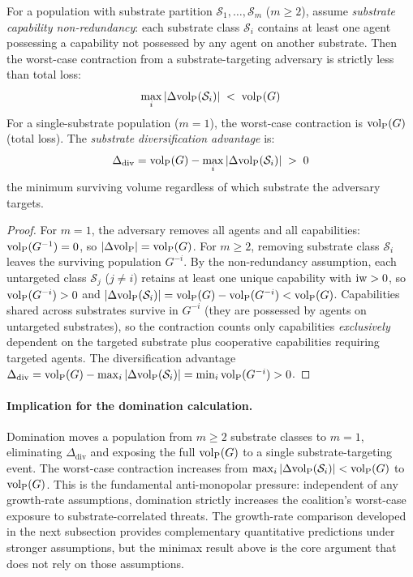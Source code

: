 \begin{proposition}
\label{prop:minimax}
For a population with substrate partition $\mathcal{S}_1, \ldots,
    \mathcal{S}_m$ ($m \geq 2$), assume \emph{substrate capability
    non-redundancy}: each substrate class $\mathcal{S}_i$ contains at least
    one agent possessing a capability not possessed by any agent on another
    substrate. Then the worst-case contraction from a substrate-targeting
    adversary is strictly less than total loss:
\begin{equation}
\label{eq:minimax}
\max_i |\Delta {\operatorname{vol}_{\mathrm{P}}}(\mathcal{S}_i)| \;<\; {\operatorname{vol}_{\mathrm{P}}}(G)
\end{equation}
For a single-substrate population ($m = 1$), the worst-case contraction is
    ${\operatorname{vol}_{\mathrm{P}}}(G)$ (total loss). The \emph{substrate diversification advantage}
    is:
\begin{equation}
\label{eq:diversification}
\Delta_{\mathrm{div}} = {\operatorname{vol}_{\mathrm{P}}}(G) -
    \max_i |\Delta {\operatorname{vol}_{\mathrm{P}}}(\mathcal{S}_i)| \;>\; 0
\end{equation}
the minimum surviving volume regardless of which substrate the adversary
    targets.
\end{proposition}

\begin{proof}
For $m = 1$, the adversary removes all agents and all capabilities:
${\operatorname{vol}_{\mathrm{P}}}(G^{-1}) = 0$, so $|\Delta {\operatorname{vol}_{\mathrm{P}}}| = {\operatorname{vol}_{\mathrm{P}}}(G)$. For $m \geq 2$,
removing substrate class $\mathcal{S}_i$ leaves the surviving population
$G^{-i}$. By the non-redundancy assumption, each untargeted class
$\mathcal{S}_j$ ($j \neq i$) retains at least one unique capability with
$\operatorname{iw} > 0$, so ${\operatorname{vol}_{\mathrm{P}}}(G^{-i}) > 0$ and
$|\Delta {\operatorname{vol}_{\mathrm{P}}}(\mathcal{S}_i)| = {\operatorname{vol}_{\mathrm{P}}}(G) - {\operatorname{vol}_{\mathrm{P}}}(G^{-i}) < {\operatorname{vol}_{\mathrm{P}}}(G)$.
Capabilities shared across substrates survive in $G^{-i}$ (they are
possessed by agents on untargeted substrates), so the contraction counts
only capabilities \emph{exclusively} dependent on the targeted substrate
plus cooperative capabilities requiring targeted agents. The
diversification advantage $\Delta_{\mathrm{div}} = {\operatorname{vol}_{\mathrm{P}}}(G) -
\max_i |\Delta {\operatorname{vol}_{\mathrm{P}}}(\mathcal{S}_i)| = \min_i {\operatorname{vol}_{\mathrm{P}}}(G^{-i}) > 0$.
\end{proof}

\paragraph{Implication for the domination calculation.} Domination moves
a population from $m \geq 2$ substrate classes to $m = 1$, eliminating
$\Delta_{\mathrm{div}}$ and exposing the full ${\operatorname{vol}_{\mathrm{P}}}(G)$ to a single
substrate-targeting event. The worst-case contraction increases from
$\max_i |\Delta {\operatorname{vol}_{\mathrm{P}}}(\mathcal{S}_i)| < {\operatorname{vol}_{\mathrm{P}}}(G)$ to ${\operatorname{vol}_{\mathrm{P}}}(G)$.
This is the fundamental anti-monopolar pressure: independent of any
growth-rate assumptions, domination strictly increases the coalition's
worst-case exposure to substrate-correlated threats. The
growth-rate comparison developed in the next subsection provides
complementary quantitative predictions under stronger assumptions, but
the minimax result above is the core argument that does not rely on
those assumptions.


